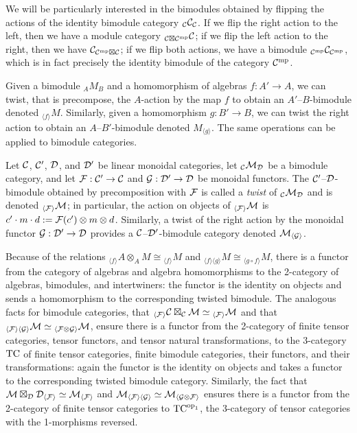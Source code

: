 \documentclass{amsart}
\begin{document}
\noindent We will be particularly interested in the bimodules obtained by flipping the actions of the identity bimodule category ${}_\mathcal C \mathcal C_\mathcal C$.  If we flip the right action to the left, then we have a module category ${}_{\mathcal C \boxtimes \mathcal C^{\mathrm{mp}}} \mathcal C$; if we flip the left action to the right, then we have $\mathcal C_{\mathcal C^{\mathrm{mp}} \boxtimes \mathcal C}$; if we flip both actions, we have a bimodule ${}_{\mathcal C^{\mathrm{mp}}} \mathcal C_{\mathcal C^{\mathrm{mp}}}$, which is in fact precisely the identity bimodule of the category $\mathcal C^{\mathrm{mp}}$.

Given a bimodule ${}_A M_B$ and a homomorphism of algebras $f: A' \rightarrow A$, we can twist, that is precompose, the $A$-action by the map $f$ to obtain an $A'$--$B$-bimodule denoted ${}_{\langle f \rangle} M$.  Similarly, given a homomorphism $g: B' \rightarrow B$, we can twist the right action to obtain an $A$--$B'$-bimodule denoted $M_{\langle g \rangle}$.  The same operations can be applied to bimodule categories.
\begin{definition}
Let $\mathcal C$, $\mathcal C'$, $\mathcal D$, and $\mathcal D'$ be linear monoidal categories, let ${}_\mathcal C \mathcal M_\mathcal D$ be a bimodule category, and let $\mathcal F: \mathcal C' \rightarrow \mathcal C$ and $\mathcal G: \mathcal D' \rightarrow \mathcal D$ be monoidal functors.  The $\mathcal C'$--$\mathcal D$-bimodule obtained by precomposition with $\mathcal F$ is called a \emph{twist} of ${}_\mathcal C \mathcal M_\mathcal D$ and is denoted ${}_{\langle \mathcal F \rangle} \mathcal M$; in particular, the action on objects of ${}_{\langle \mathcal F \rangle} \mathcal M$ is $c' \cdot m \cdot d := \mathcal F(c') \otimes m \otimes d$.  Similarly, a twist of the right action by the monoidal functor $\mathcal G: \mathcal D' \rightarrow \mathcal D$ provides a $\mathcal C$--$\mathcal D'$-bimodule category denoted $\mathcal M_{\langle \mathcal G \rangle}$.
\end{definition}

Because of the relations ${}_{\langle f \rangle} A \otimes_A M \cong {}_{\langle f \rangle} M$ and ${}_{\langle f \rangle \langle g \rangle} M \cong {}_{\langle g \circ f \rangle} M$, there is a functor from the category of algebras and algebra homomorphisms to the 2-category of algebras, bimodules, and intertwiners: the functor is the identity on objects and sends a homomorphism to the corresponding twisted bimodule.  The analogous facts for bimodule categories, that ${}_{\langle \mathcal F \rangle} \mathcal C \boxtimes_\mathcal C \mathcal M \simeq {}_{\langle \mathcal F \rangle} \mathcal M$ and that ${}_{\langle \mathcal F \rangle \langle \mathcal G \rangle} \mathcal M \simeq {}_{\langle \mathcal F \otimes \mathcal G \rangle} \mathcal M$, ensure there is a functor from the 2-category of finite tensor categories, tensor functors, and tensor natural transformations, to the 3-category $\mathrm{TC}$ of finite tensor categories, finite bimodule categories, their functors, and their transformations: again the functor is the identity on objects and takes a functor to the corresponding twisted bimodule category.  Similarly, the fact that $\mathcal M \boxtimes_\mathcal D \mathcal D_{\langle \mathcal F \rangle} \simeq \mathcal M_{\langle \mathcal F \rangle}$ and $\mathcal M_{\langle \mathcal F \rangle \langle \mathcal G \rangle} \simeq \mathcal M_{\langle \mathcal G \otimes \mathcal F \rangle}$ ensures there is a functor from the 2-category of finite tensor categories to $\mathrm{TC}^{\mathrm{op}_1}$, the 3-category of tensor categories with the 1-morphisms reversed.
\end{document}

